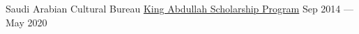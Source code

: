 

\begin{cventries}

  \cventrynodesc
    {Saudi Arabian Cultural Bureau} %
    {\href{https://www.saudibureau.org/en/inside.php?ID=16}{King Abdullah Scholarship Program}} %
    {} %
    {Sep 2014 — May 2020} %

\end{cventries}
